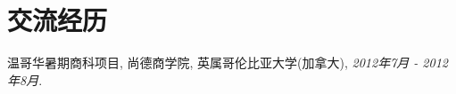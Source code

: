 \documentclass[letterpaper]{article}
\def\footerlink{}
\renewenvironment{itemize}{
  \begin{list}{}{
    \setlength{\leftmargin}{1.5em}
  }
}{
  \end{list}
}
\begin{document}



\section*{交流经历}

\begin{itemize}
  \item 温哥华暑期商科项目, 
   尚德商学院, 英属哥伦比亚大学(加拿大), {\it  2012年7月 - 2012年8月}.
\end{itemize}





\end{document}
